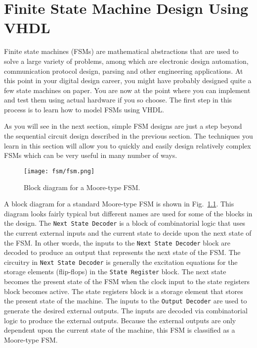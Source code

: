 %
%
\chapter{Finite State Machine Design Using VHDL}
Finite state machines (FSMs) are mathematical abstractions that are used to solve a large variety of problems, among which are electronic design automation, communication protocol design, parsing and other engineering applications. At this point in your digital design career, you might have probably designed quite a few state machines on paper. You are now at the point where you can implement and test them using actual hardware if you so choose. The first step in this process is to learn how to model FSMs using VHDL. 

As you will see in the next section, simple FSM designs are just a step beyond the sequential circuit design described in the previous section. The techniques you learn in this section will allow you to quickly and easily design relatively complex FSMs which can be very useful in many number of ways.

\begin{figure}
    \centering
	\texttt{[image: fsm/fsm.png]}
	\caption{Block diagram for a Moore-type FSM.}
	\label{fsm}
\end{figure}

A block diagram for a standard Moore-type FSM is shown in Fig.~\ref{fsm}. This diagram looks fairly typical but different names are used for some of the blocks in the design. The \texttt{Next State Decoder} is a block of combinatorial logic that uses the current external inputs and the current state to decide upon the next state of the FSM. In other words, the inputs to the \texttt{Next State Decoder} block are decoded to produce an output that represents the next state of the FSM. The circuitry in \texttt{Next State Decoder} is generally the excitation equations for the storage elements (flip-flops) in the \texttt{State Register} block. The next state becomes the present state of the FSM when the clock input to the state registers block becomes active. The state registers block is a storage element that stores the present state of the machine. The inputs to the \texttt{Output Decoder} are used to generate the desired external outputs. The inputs are decoded via combinatorial logic to produce the external outputs. Because the external outputs are only dependent upon the current state of the machine, this FSM is classified as a Moore-type FSM.

